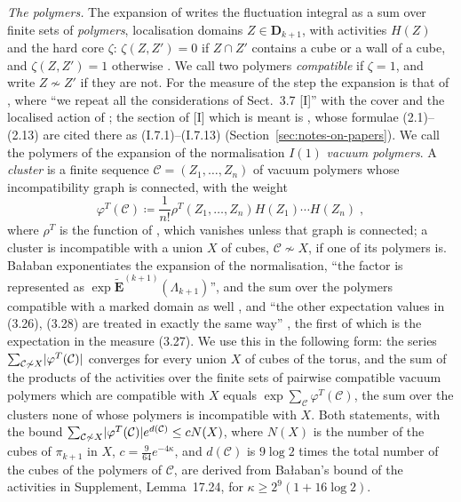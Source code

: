 \documentclass[11pt]{preprint}
\DeclarePairedDelimiter{\abs}{\lvert}{\rvert}
\numberwithin{equation}{section}
\theoremstyle{definition}
\theoremstyle{remark}
\theoremstyle{plain}
\begin{document}
\emph{The polymers.} The expansion of \cite[Sect.~2]{BalabanRG2} writes the fluctuation integral as a sum over finite sets of \emph{polymers}, localisation domains $Z \in \mathbf D_{k+1}$, with activities $H(Z)$ and the hard core $\zeta$: $\zeta(Z, Z') = 0$ if $Z \cap Z'$ contains a cube or a wall of a cube, and $\zeta(Z, Z') = 1$ otherwise \cite[(2.8)--(2.11), p.~14]{BalabanRG2}. We call two polymers \emph{compatible} if $\zeta = 1$, and write $Z \not\sim Z'$ if they are not. For the measure \cite[(3.27)]{BalabanCRE} of the step the expansion is that of \cite[pp.~275--279]{BalabanCRE}, where ``we repeat all the considerations of Sect.~3.7 [I]'' with the cover and the localised action of \cite[pp.~275--277]{BalabanCRE}; the section of [I] which is meant is \cite[Sect.~2]{BalabanRG2}, whose formulae (2.1)--(2.13) are cited there as (I.7.1)--(I.7.13) (Section~\ref{sec:notes-on-papers}). We call the polymers of the expansion of the normalisation $I(1)$ \emph{vacuum polymers}. A \emph{cluster} is a finite sequence $\mathcal C = (Z_1, \dots, Z_n)$ of vacuum polymers whose incompatibility graph is connected, with the weight
\begin{equation}\label{eq:vacuum-cluster-weight}
    \varphi^T(\mathcal C) \coloneqq \frac{1}{n!}\rho^T(Z_1, \dots, Z_n)H(Z_1) \cdots H(Z_n)\;,
\end{equation}
where $\rho^T$ is the function of \cite[(2.12), p.~14]{BalabanRG2}, which vanishes unless that graph is connected; a cluster is incompatible with a union $X$ of cubes, $\mathcal C \not\sim X$, if one of its polymers is. Ba{\l}aban exponentiates the expansion of the normalisation, ``the factor is represented as $\exp\tilde{\mathbf E}^{(k+1)}(\Lambda_{k+1})$'', and the sum over the polymers compatible with a marked domain as well \cite[pp.~277--278]{BalabanCRE}, and ``the other expectation values in (3.26), (3.28) are treated in exactly the same way'' \cite[p.~279]{BalabanCRE}, the first of which is the expectation in the measure (3.27). We use this in the following form: the series $\sum_{\mathcal C \not\sim X}\abs{\varphi^T(\mathcal C)}$ converges for every union $X$ of cubes of the torus, and the sum of the products of the activities over the finite sets of pairwise compatible vacuum polymers which are compatible with $X$ equals $\exp\sum_{\mathcal C}\varphi^T(\mathcal C)$, the sum over the clusters none of whose polymers is incompatible with $X$. Both statements, with the bound $\sum_{\mathcal C \not\sim X}\abs{\varphi^T(\mathcal C)}e^{d(\mathcal C)} \leq cN(X)$, where $N(X)$ is the number of the cubes of $\pi_{k+1}$ in $X$, $c = \frac{9}{64}e^{-4\kappa}$, and $d(\mathcal C)$ is $9\log 2$ times the total number of the cubes of the polymers of $\mathcal C$, are derived from Ba{\l}aban's bound \cite[(2.38), p.~20]{BalabanRG2} of the activities in Supplement, Lemma~17.24, for $\kappa \geq 2^9(1 + 16\log 2)$.
\end{document}
